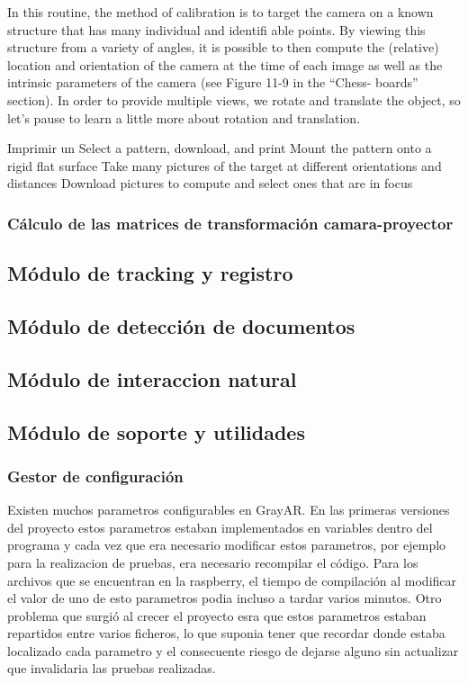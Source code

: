 In this routine, the method of
calibration is to target the camera on a known structure that has many individual and
identifi able points. By viewing this structure from a variety of angles, it is possible to
then compute the (relative) location and orientation of the camera at the time of each
image as well as the intrinsic parameters of the camera (see Figure 11-9 in the “Chess-
boards” section). In order to provide multiple views, we rotate and translate the object,
so let’s pause to learn a little more about rotation and translation.

Imprimir un Select a pattern, download, and print
Mount the pattern onto a rigid flat surface
Take many pictures of the target at different orientations and distances
Download pictures to compute and select ones that are in focus



\subsubsection{Cálculo de las matrices de transformación camara-proyector}
\subsection{Módulo de tracking y registro}
\subsection{Módulo de detección de documentos}
\subsection{Módulo de interaccion natural}
\subsection{Módulo de soporte y utilidades}
\subsubsection{Gestor de configuración}
Existen muchos parametros configurables en GrayAR. En las primeras versiones del proyecto estos parametros estaban implementados en variables dentro del programa y cada vez que era necesario modificar estos parametros, por ejemplo para la realizacion de pruebas, era necesario recompilar el código. Para los archivos que se encuentran en la raspberry, el tiempo de compilación al modificar el valor de uno de esto parametros podia incluso a tardar varios minutos. Otro problema que surgió al crecer el proyecto esra que estos parametros estaban repartidos entre varios ficheros, lo que suponia tener que recordar donde estaba localizado cada parametro y el consecuente riesgo de dejarse alguno sin actualizar que invalidaria las pruebas realizadas.

